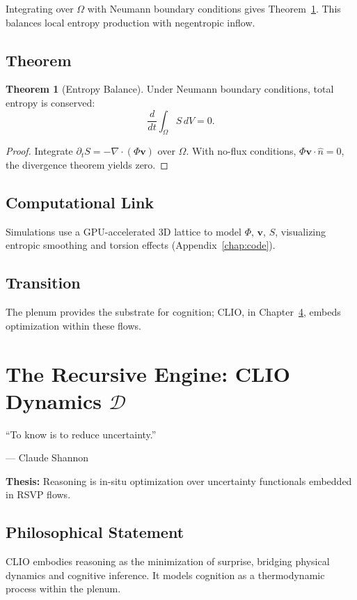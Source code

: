 \documentclass[12pt]{book}
\theoremstyle{definition}
\newtheorem{theorem}{Theorem}[chapter]
\begin{document}
Integrating over \(\Omega\) with Neumann boundary conditions gives Theorem~\ref{thm:entropy_balance}. This balances local entropy production with negentropic inflow.

\section{Theorem}
\begin{theorem}[Entropy Balance]
\label{thm:entropy_balance}
Under Neumann boundary conditions, total entropy is conserved:
\begin{equation}
\frac{d}{dt}\int_\Omega S \, dV = 0.
\end{equation}
\end{theorem}

\begin{proof}
Integrate \(\partial_t S = -\nabla \cdot (\Phi \mathbf{v})\) over \(\Omega\). With no-flux conditions, \(\Phi \mathbf{v} \cdot \hat{n} = 0\), the divergence theorem yields zero.
\end{proof}

\section{Computational Link}
Simulations use a GPU-accelerated 3D lattice to model \(\Phi\), \(\mathbf{v}\), \(S\), visualizing entropic smoothing and torsion effects (Appendix~\ref{chap:code}).

\section{Transition}
The plenum provides the substrate for cognition; CLIO, in Chapter~\ref{chap:clio}, embeds optimization within these flows.

\chapter{The Recursive Engine: CLIO Dynamics \texorpdfstring{\(\mathcal{D}\)}{D}}
\label{chap:clio}
\epigraph{``To know is to reduce uncertainty.''}{--- Claude Shannon}

\textbf{Thesis:} Reasoning is in-situ optimization over uncertainty functionals embedded in RSVP flows.

\section{Philosophical Statement}
CLIO embodies reasoning as the minimization of surprise, bridging physical dynamics and cognitive inference. It models cognition as a thermodynamic process within the plenum.
\end{document}
